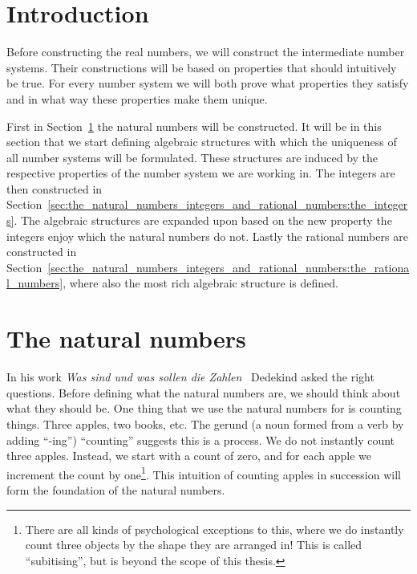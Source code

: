 \documentclass[../main.tex]{subfiles}
\begin{document}
\section*{Introduction}
Before constructing the real numbers, we will construct the intermediate number systems. Their constructions will be based on properties that should intuitively be true. For every number system we will both prove what properties they satisfy and in what way these properties make them unique.

First in Section~\ref{sec:the_natural_numbers_integers_and_rational_numbers:the_natural_numbers} the natural numbers will be constructed. It will be in this section that we start defining algebraic structures with which the uniqueness of all number systems will be formulated. These structures are induced by the respective properties of the number system we are working in. The integers are then constructed in Section~\ref{sec:the_natural_numbers_integers_and_rational_numbers:the_integers}. The algebraic structures are expanded upon based on the new property the integers enjoy which the natural numbers do not. Lastly the rational numbers are constructed in Section~\ref{sec:the_natural_numbers_integers_and_rational_numbers:the_rational_numbers}, where also the most rich algebraic structure is defined.

\section{The natural numbers}\label{sec:the_natural_numbers_integers_and_rational_numbers:the_natural_numbers}
In his work \textit{\textgerman{Was sind und was sollen die Zahlen}}~\cite{Dedekind1888} Dedekind asked the right questions. Before defining what the natural numbers are, we should think about what they should be. One thing that we use the natural numbers for is counting things. Three apples, two books, etc. The gerund (a noun formed from a verb by adding ``-ing'') ``counting'' suggests this is a process. We do not instantly count three apples. Instead, we start with a count of zero, and for each apple we increment the count by one\footnote{There are all kinds of psychological exceptions to this, where we do instantly count three objects by the shape they are arranged in! This is called ``subitising'', but is beyond the scope of this thesis.}. This intuition of counting apples in succession will form the foundation of the natural numbers.
\end{document}
